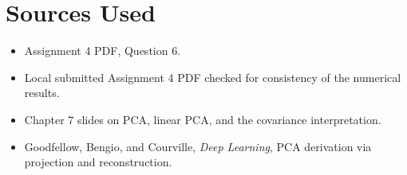 \documentclass[11pt]{article}
\begin{document}
\section*{Sources Used}

\begin{itemize}
    \item Assignment 4 PDF, Question 6.
    \item Local submitted Assignment 4 PDF checked for consistency of the numerical results.
    \item Chapter 7 slides on PCA, linear PCA, and the covariance interpretation.
    \item Goodfellow, Bengio, and Courville, \emph{Deep Learning}, PCA derivation via projection and reconstruction.
\end{itemize}
\end{document}
